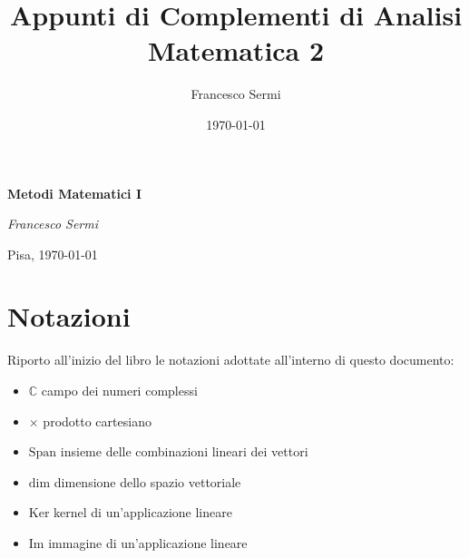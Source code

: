 \documentclass[12pt, twoside, italian, openany]{book}
\title{Appunti di Complementi di Analisi Matematica 2}
\author{Francesco Sermi}
\date{\today}
\begin{document}
	\begin{titlepage}
	\centering
	\vspace*{3cm}
	{\huge\bfseries Metodi Matematici I \par}
	\vspace{2cm}
	{\Large\itshape Francesco Sermi\par}
	\vfill




	\vfill	
	{\large \hfill Pisa, \today \par}
	\end{titlepage}
	\chapter*{Notazioni}

	\pagestyle{plain}
	\thispagestyle{empty}
	\pagestyle{fancy}

	Riporto all'inizio del libro le notazioni adottate all'interno di questo documento:
	\begin{itemize}[label=\hspace{-0.5em}]
		\item $\mathbb{C}$ campo dei numeri complessi
		\item $\times$ prodotto cartesiano
		\item $\text{Span}$ insieme delle combinazioni lineari dei vettori
		\item $\text{dim}$ dimensione dello spazio vettoriale
		\item $\text{Ker}$ kernel di un'applicazione lineare
		\item $\text{Im}$ immagine di un'applicazione lineare
	\end{itemize}
	\tableofcontents
\end{document}
